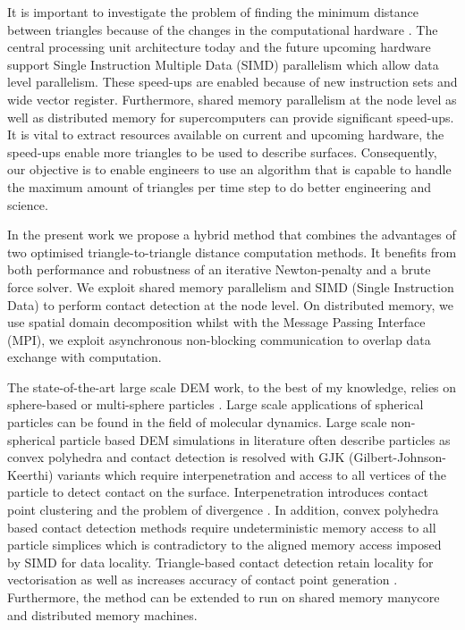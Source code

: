 \documentclass[times,12pt]{article}
\begin{document}
It is important to investigate the problem of finding the minimum distance between triangles because of the changes in the computational hardware \cite{Dongarra2011}. The central processing unit architecture today and the future upcoming hardware support Single Instruction Multiple Data (SIMD)\cite{Alvarez2007} parallelism which allow data level parallelism. These speed-ups are enabled because of new instruction sets and wide vector register. Furthermore, shared memory parallelism at the node level as well as distributed memory for supercomputers can provide significant speed-ups. It is vital to extract resources available on current and upcoming hardware, the speed-ups enable more triangles to be used to describe surfaces. Consequently, our objective is to enable engineers to use an algorithm that is capable to handle the maximum amount of triangles per time step to do better engineering and science.

In the present work we propose a hybrid method that combines the advantages of two optimised triangle-to-triangle distance computation methods. It benefits from both performance and robustness of an iterative Newton-penalty and a brute force solver. We exploit shared memory parallelism and SIMD (Single Instruction Data) to perform contact detection at the node level. On distributed memory, we use spatial domain decomposition  whilst with the Message Passing Interface (MPI), we exploit asynchronous non-blocking communication to overlap data exchange with computation.

The state-of-the-art large scale DEM work, to the best of my knowledge, relies on sphere-based or multi-sphere particles \cite{Gonnet2013, Gonnet2014}. Large scale applications of spherical particles can be found in the field of molecular dynamics. Large scale non-spherical particle based DEM simulations in literature \cite{Girolami2012, Iglberger2009, Iglberger2010, Iglberger2011} often describe particles as convex polyhedra and contact detection is resolved with GJK (Gilbert-Johnson-Keerthi) \cite{Ericson2005} variants which require interpenetration and access to all vertices of the particle to detect contact on the surface. Interpenetration introduces contact point clustering and the problem of divergence \cite{Koziara2008, koziara2011, Krestenitis2015}. In addition, convex polyhedra based contact detection methods require undeterministic memory access to all particle simplices \cite{Ericson2005} which is contradictory to the aligned memory access imposed by SIMD for data locality. Triangle-based contact detection retain locality for vectorisation as well as increases accuracy of contact point generation \cite{Krestenitis2015}. Furthermore, the method can be extended to run on shared memory manycore and distributed memory machines.
\end{document}
